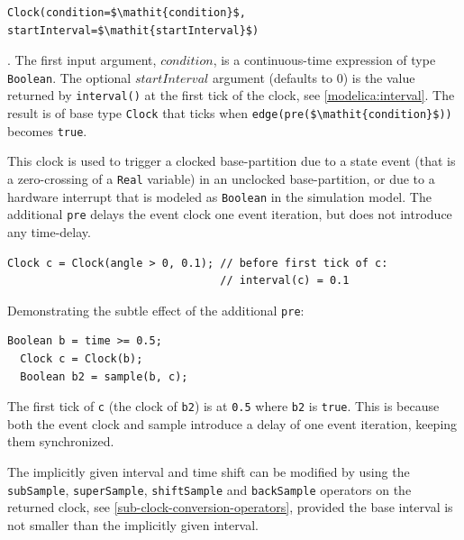 \begin{operatordefinition*}[Clock]\label{modelica:clock-event}
\begin{synopsis}\begin{lstlisting}
Clock(condition=$\mathit{condition}$, startInterval=$\mathit{startInterval}$)
\end{lstlisting}\end{synopsis}
\begin{semantics}
.
The first input argument, $\mathit{condition}$, is a continuous-time expression of type \lstinline!Boolean!.
The optional $\mathit{startInterval}$ argument (defaults to 0) is the value returned by \lstinline!interval()! at the first tick of the clock, see \cref{modelica:interval}.
The result is of base type \lstinline!Clock! that ticks when \lstinline!edge(pre($\mathit{condition}$))! becomes \lstinline!true!.
\begin{nonnormative}
This clock is used to trigger a clocked base-partition due to a state event (that is a zero-crossing of a \lstinline!Real! variable) in an unclocked base-partition, or due to a hardware interrupt that is modeled as \lstinline!Boolean! in the simulation model.
The additional \lstinline!pre! delays the event clock one event iteration, but does not introduce any time-delay.
\end{nonnormative}

\begin{example}
\begin{lstlisting}[language=modelica]
Clock c = Clock(angle > 0, 0.1); // before first tick of c:
                                 // interval(c) = 0.1
\end{lstlisting}
\end{example}

\begin{example}
Demonstrating the subtle effect of the additional \lstinline!pre!:
\begin{lstlisting}[language=modelica]
  Boolean b = time >= 0.5;
  Clock c = Clock(b);
  Boolean b2 = sample(b, c);
\end{lstlisting}
The first tick of \lstinline!c! (the clock of \lstinline!b2!) is at \lstinline!0.5! where \lstinline!b2! is \lstinline!true!.
This is because both the event clock and sample introduce a delay of one event iteration, keeping them synchronized.
\end{example}

\begin{nonnormative}
The implicitly given interval and time shift can be modified by using the \lstinline!subSample!, \lstinline!superSample!, \lstinline!shiftSample! and \lstinline!backSample! operators on the returned clock, see \cref{sub-clock-conversion-operators}, provided the base interval is not smaller than the implicitly given interval.
\end{nonnormative}
\end{semantics}
\end{operatordefinition*}

